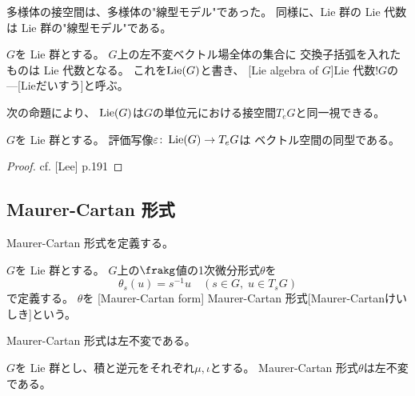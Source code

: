 \documentclass[report]{jlreq}
\begin{document}
多様体の接空間は、多様体の"線型モデル"であった。
同様に、Lie 群の Lie 代数は Lie 群の"線型モデル"である。



\begin{definition}
    $G$を Lie 群とする。
    $G$上の左不変ベクトル場全体の集合に
    交換子括弧を入れたものは Lie 代数となる。
    これを$\operatorname{Lie}(G)$と書き、
    [Lie algebra of $G$]{Lie 代数!$G$の---}[Lieだいすう]と呼ぶ。
\end{definition}

次の命題により、
$\operatorname{Lie}(G)$は$G$の単位元における接空間$T_e G$と同一視できる。

\begin{proposition}
    $G$を Lie 群とする。
    評価写像$\varepsilon \colon \operatorname{Lie}(G) \to T_eG$は
    ベクトル空間の同型である。
\end{proposition}

\begin{proof}
    cf. [Lee] p.191
\end{proof}

\begin{example}
    \TODO{}
\end{example}


\subsection{Maurer-Cartan 形式}


Maurer-Cartan 形式を定義する。

\begin{definition}
    $G$を Lie 群とする。
    $G$上の$\frakg$値の1次微分形式$\theta$を
    \begin{equation}
        \theta_s(u) = s^{-1}u
        \quad (s \in G,\; u \in T_sG)
    \end{equation}
    で定義する。
    $\theta$を
    [Maurer-Cartan form]
    {Maurer-Cartan 形式}[Maurer-Cartanけいしき]という。
\end{definition}

Maurer-Cartan 形式は左不変である。

\begin{proposition}
    $G$を Lie 群とし、積と逆元をそれぞれ$\mu, \iota$とする。
    Maurer-Cartan 形式$\theta$は左不変である。
\end{proposition}
\end{document}
